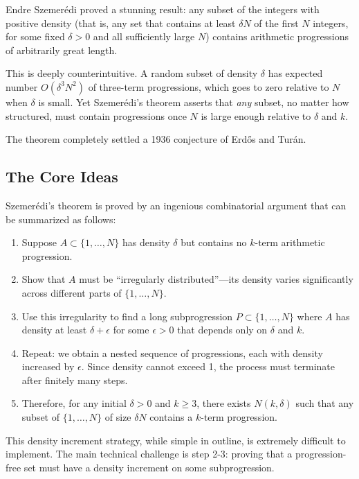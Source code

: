Endre Szemer\'edi proved a stunning result: any subset of the integers with positive density (that is, any set that contains at least $\delta N$ of the first $N$ integers, for some fixed $\delta > 0$ and all sufficiently large $N$) contains arithmetic progressions of arbitrarily great length.

This is deeply counterintuitive. A random subset of density $\delta$ has expected number $O(\delta^3 N^2)$ of three-term progressions, which goes to zero relative to $N$ when $\delta$ is small. Yet Szemer\'edi's theorem asserts that \emph{any} subset, no matter how structured, must contain progressions once $N$ is large enough relative to $\delta$ and $k$.

The theorem completely settled a 1936 conjecture of Erd\H{o}s and Tur\'an.

\subsection{The Core Ideas}

Szemer\'edi's theorem is proved by an ingenious combinatorial argument that can be summarized as follows:
\begin{enumerate}
\item Suppose $A \subset \{1,\ldots,N\}$ has density $\delta$ but contains no $k$-term arithmetic progression.
\item Show that $A$ must be ``irregularly distributed''---its density varies significantly across different parts of $\{1,\ldots,N\}$.
\item Use this irregularity to find a long subprogression $P \subset \{1,\ldots,N\}$ where $A$ has density at least $\delta + \epsilon$ for some $\epsilon > 0$ that depends only on $\delta$ and $k$.
\item Repeat: we obtain a nested sequence of progressions, each with density increased by $\epsilon$. Since density cannot exceed 1, the process must terminate after finitely many steps.
\item Therefore, for any initial $\delta > 0$ and $k \geq 3$, there exists $N(k,\delta)$ such that any subset of $\{1,\ldots,N\}$ of size $\delta N$ contains a $k$-term progression.
\end{enumerate}

This density increment strategy, while simple in outline, is extremely difficult to implement. The main technical challenge is step 2-3: proving that a progression-free set must have a density increment on some subprogression.

